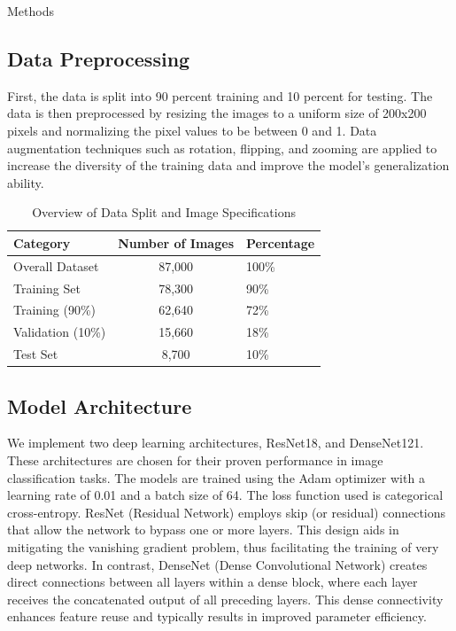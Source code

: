 \documentclass[12pt, a4paper]{article}
\begin{document}
\begin{section}{Methods}
    \subsection{Data Preprocessing}
    First, the data is split into 90 percent training and 10 percent for testing. The data is then preprocessed by resizing the images to a uniform size of 200x200 pixels and normalizing the pixel values to be between 0 and 1. Data augmentation techniques such as rotation, flipping, and zooming are applied to increase the diversity of the training data and improve the model's generalization ability.
    \begin{table}[H]
        \centering
        \caption{Overview of Data Split and Image Specifications}
        \label{tab:datasplit}
        \begin{tabular}{|l|cl|}
        \hline
        \textbf{Category} & \textbf{Number of Images} & \textbf{Percentage} \\
        \hline
        Overall Dataset & 87,000 & 100\% \\
        Training Set & 78,300 & 90\% \\
        \quad Training (90\%) & 62,640 & 72\% \\ 
        \quad Validation (10\%) & 15,660 & 18\% \\ 
        Test Set & 8,700 & 10\% \\
        \hline
        \end{tabular}
        \end{table}
    \subsection{Model Architecture}
    We implement two deep learning architectures,  ResNet18, and DenseNet121. These architectures are chosen for their proven performance in image classification tasks. The models are trained using the Adam optimizer with a learning rate of 0.01 and a batch size of 64. The loss function used is categorical cross-entropy.
    ResNet (Residual Network) employs skip (or residual) connections that allow the network to bypass one or more layers. This design aids in mitigating the vanishing gradient problem, thus facilitating the training of very deep networks. In contrast, DenseNet (Dense Convolutional Network) creates direct connections between all layers within a dense block, where each layer receives the concatenated output of all preceding layers. This dense connectivity enhances feature reuse and typically results in improved parameter efficiency.
    

\end{section}
\end{document}
